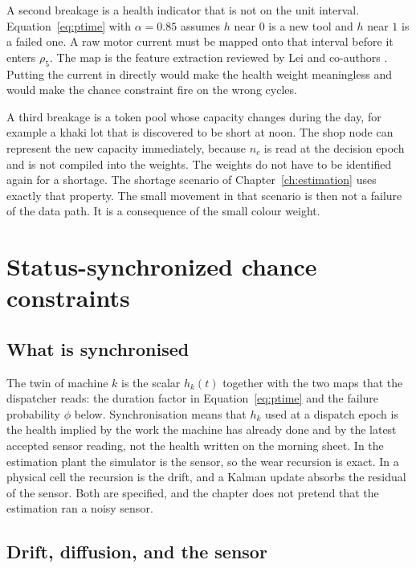 A second breakage is a health indicator that is not on the unit interval. Equation~\eqref{eq:ptime} with \(\alpha = 0.85\) assumes \(h\) near \(0\) is a new tool and \(h\) near \(1\) is a failed one. A raw motor current must be mapped onto that interval before it enters \(\rho_5\). The map is the feature extraction reviewed by Lei and co-authors \cite{lei2018}. Putting the current in directly would make the health weight meaningless and would make the chance constraint fire on the wrong cycles.

A third breakage is a token pool whose capacity changes during the day, for example a khaki lot that is discovered to be short at noon. The shop node can represent the new capacity immediately, because \(n_c\) is read at the decision epoch and is not compiled into the weights. The weights do not have to be identified again for a shortage. The shortage scenario of Chapter~\ref{ch:estimation} uses exactly that property. The small movement in that scenario is then not a failure of the data path. It is a consequence of the small colour weight.

\section{Status-synchronized chance constraints}
\label{sec:ssdt}

\subsection{What is synchronised}

The twin of machine \(k\) is the scalar \(h_k(t)\) together with the two maps that the dispatcher reads: the duration factor in Equation~\eqref{eq:ptime} and the failure probability \(\phi\) below. Synchronisation means that \(h_k\) used at a dispatch epoch is the health implied by the work the machine has already done and by the latest accepted sensor reading, not the health written on the morning sheet. In the estimation plant the simulator is the sensor, so the wear recursion is exact. In a physical cell the recursion is the drift, and a Kalman update absorbs the residual of the sensor. Both are specified, and the chapter does not pretend that the estimation ran a noisy sensor.

\subsection{Drift, diffusion, and the sensor}

